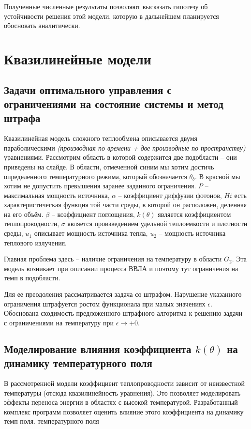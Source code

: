 \documentclass[8pt,a4paper]{article}
\begin{document}
    Полученные численные результаты позволяют высказать гипотезу
    об устойчивости решения этой модели, которую в дальнейшем планируется обосновать аналитически.


    \section*{Квазилинейные модели}
    \subsection*{Задачи оптимального управления с ограничениями на состояние системы и метод штрафа}
    Квазилинейная модель сложного теплообмена описывается двумя параболическими
    \textit{(производная по времени + две производные по пространству)} уравнениями.
    Рассмотрим область в которой содержится две подобласти -- они приведены на слайде.
    В области, отмеченной синим мы хотим достичь определенного температурного режима, который обозначается $\theta_b$.
    В красной мы хотим не допустить превышения заранее заданного ограничения.
    $P$ – максимальная мощность источника,
    $\alpha$ – коэффициент диффузии фотонов,
    $Hi$ есть характеристическая функция той части среды, в которой он расположен, деленная на его объём.
    $\beta$ – коэффициент поглощения, $k(\theta)$ является коэффициентом теплопроводности,
    $\sigma$ является произведением удельной теплоемкости и плотности среды,
    $u_1$ описывает мощность источника тепла,
    $u_2$ – мощность источника теплового излучения.

    Главная проблема здесь -- наличие ограничения на температуру в области $G_2$.
    Эта модель возникает при описании процесса ВВЛА и поэтому тут ограничения на темп в подобласти.

    Для ее преодоления рассматривается задача со штрафом.
    Нарушение указанного ограничения штрафуется ростом функционала при малых значениях $\epsilon$.
    Обоснована сходимость предложенного штрафного алгоритма к решению задачи
    с ограничениями на температуру при $\epsilon\to+0$.


    \subsection*{Моделирование влияния коэффициента $k(\theta)$ на динамику температурного поля}
    В рассмотренной модели коэффициент теплопроводности зависит от
    неизвестной температуры (отсюда квазилинейность уравнения).
    Это позволяет моделировать эффекты переноса энергии в
    областях с высокой температурой.
    Разработанный комплекс программ позволяет оценить
    влияние этого коэффициента на динамику темп поля.
    температурного поля
\end{document}
